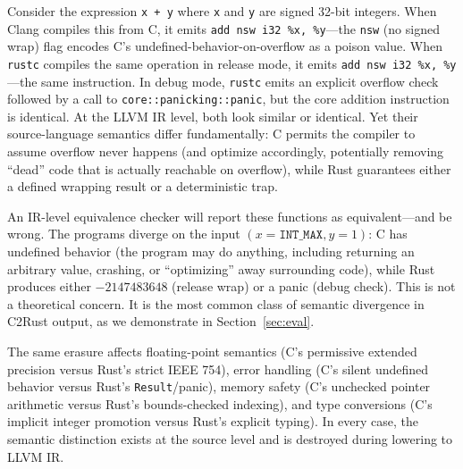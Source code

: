 \documentclass[11pt]{article}
\begin{document}
Consider the expression \texttt{x + y} where \texttt{x} and \texttt{y} are signed 32-bit integers.
When Clang compiles this from C, it emits \texttt{add nsw i32 \%x, \%y}---the \texttt{nsw} (no signed wrap) flag encodes C's undefined-behavior-on-overflow as a poison value.
When \texttt{rustc} compiles the same operation in release mode, it emits \texttt{add nsw i32 \%x, \%y}---the same instruction.
In debug mode, \texttt{rustc} emits an explicit overflow check followed by a call to \texttt{core::panicking::panic}, but the core addition instruction is identical.
At the LLVM IR level, both look similar or identical.
Yet their source-language semantics differ fundamentally: C permits the compiler to assume overflow never happens (and optimize accordingly, potentially removing ``dead'' code that is actually reachable on overflow), while Rust guarantees either a defined wrapping result or a deterministic trap.

An IR-level equivalence checker will report these functions as equivalent---and be wrong.
The programs diverge on the input $(x = \texttt{INT\_MAX}, y = 1)$: C has undefined behavior (the program may do anything, including returning an arbitrary value, crashing, or ``optimizing'' away surrounding code), while Rust produces either $-2147483648$ (release wrap) or a panic (debug check).
This is not a theoretical concern.
It is the most common class of semantic divergence in C2Rust output, as we demonstrate in Section~\ref{sec:eval}.

The same erasure affects floating-point semantics (C's permissive extended precision versus Rust's strict IEEE 754), error handling (C's silent undefined behavior versus Rust's \texttt{Result}/panic), memory safety (C's unchecked pointer arithmetic versus Rust's bounds-checked indexing), and type conversions (C's implicit integer promotion versus Rust's explicit typing).
In every case, the semantic distinction exists at the source level and is destroyed during lowering to LLVM IR.
\end{document}
